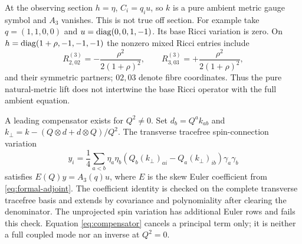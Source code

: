 At the observing section $h=\eta$, $C_i=q_i u$, so $k$ is a pure ambient
metric gauge symbol and $A_3$ vanishes. This is not true off section.
For example take $q=(1,1,0,0)$ and $u=\operatorname{diag}(0,0,1,-1)$.
Its base Ricci variation is zero. On $h=\operatorname{diag}(1+\rho,-1,-1,-1)$ the
nonzero mixed Ricci entries include
\begin{equation}
 R^{(3)}_{2,02}=-\frac{\rho^2}{2(1+\rho)^2},\qquad
 R^{(3)}_{3,03}=+\frac{\rho^2}{2(1+\rho)^2},\label{eq:nullcontrol}
\end{equation}
and their symmetric partners; $02,03$ denote fibre coordinates.
Thus the pure natural-metric lift does not intertwine the base Ricci
operator with the full ambient equation.

A leading compensator exists for $Q^2\ne0$. Set
$d_b=Q^ak_{ab}$ and
$k_\perp=k-(Q\otimes d+d\otimes Q)/Q^2$.
The transverse tracefree spin-connection variation
\begin{equation}
 y_i=\frac14\sum_{a<b}\eta_a\eta_b
       \left(Q_b(k_\perp)_{ai}-Q_a(k_\perp)_{ib}\right)\gamma_a\gamma_b
 \label{eq:compensator}
\end{equation}
satisfies $E(Q)y=A_3(q)u$, where $E$ is the skew Euler coefficient
from \eqref{eq:formal-adjoint}. The coefficient identity is checked on
the complete transverse tracefree basis and extends by covariance and
polynomiality after clearing the denominator. The unprojected spin
variation has additional Euler rows and fails this check.
Equation \eqref{eq:compensator} cancels a principal term only; it is
neither a full coupled mode nor an inverse at $Q^2=0$.

